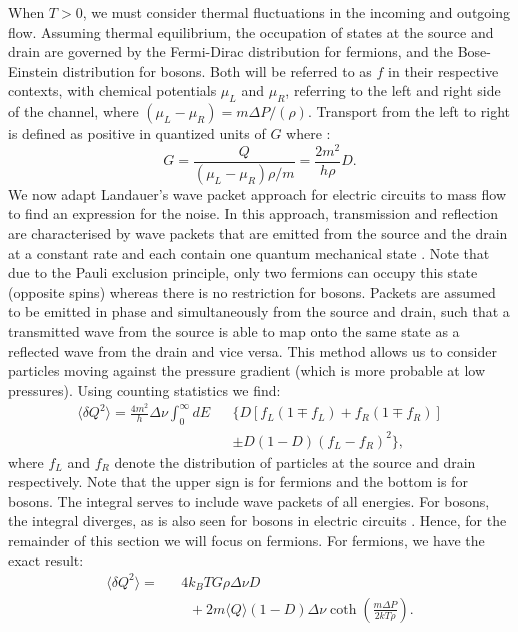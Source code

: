 \documentclass[%
 reprint,
 aps,
 prb,
 epsf,
]{revtex4-2}
\begin{document}
    When $T>0$, we must consider thermal fluctuations in the incoming and outgoing flow. Assuming thermal equilibrium, the occupation of states at the source and drain are governed by the Fermi-Dirac distribution for fermions, and the Bose-Einstein distribution for bosons. Both will be referred to as $f$ in their respective contexts, with chemical potentials $\mu_L$ and $\mu_R$, referring to the left and right side of the channel, where $(\mu_L-\mu_R) = m\Delta P/(\rho)$. Transport from the left to right is defined as positive in quantized units of $G$ where \cite{Lambert2008}:
    \begin{equation}\label{eq:quant_G}
        G = \frac{Q}{(\mu_L-\mu_R)\rho/m} = \frac{2m^2}{h\rho}D.
    \end{equation}
    We now adapt Landauer's wave packet approach for electric circuits to mass flow to find an expression for the noise. In this approach, transmission and reflection are characterised by wave packets that are emitted from the source and the drain at a constant rate and each contain one quantum mechanical state \cite{wavepacket}. Note that due to the Pauli exclusion principle, only two fermions can occupy this state (opposite spins) whereas there is no restriction for bosons. Packets are assumed to be emitted in phase and simultaneously from the source and drain, such that a transmitted wave from the source is able to map onto the same state as a reflected wave from the drain and vice versa. This method allows us to consider particles moving against the pressure gradient (which  is more probable at low pressures). Using counting statistics we find:
    \begin{eqnarray}\label{eq:quant_noiseIntegral}\nonumber
        \langle \delta Q^2\rangle = \frac{4m^2}{h}\Delta \nu\int_0^\infty dE &&\{D[f_L(1\mp f_L) + f_R(1\mp f_R)] \\
        &&\pm D(1-D)(f_L-f_R)^2\},
    \end{eqnarray}
     where $f_L$ and $f_R$ denote the distribution of particles at the source and drain respectively. Note that the upper sign is for fermions and the bottom is for bosons. The integral serves to include wave packets of all energies. For bosons, the integral diverges, as is also seen for bosons in electric circuits \cite{fractional}. Hence, for the remainder of this section we will focus on fermions. For fermions, we have the exact result:
    \begin{eqnarray}\label{eq:quant_fermions}\nonumber
        \langle \delta Q^2\rangle= &&4k_BTG\rho \Delta\nu D\\
        &&\;\;+ 2m\langle Q\rangle (1-D)\Delta\nu \coth{\left(\frac{m\Delta P}{2kT\rho}\right)}.
    \end{eqnarray}
\end{document}
